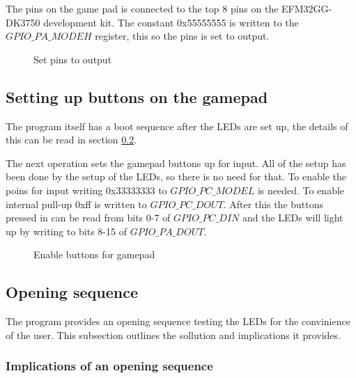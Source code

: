 The pins on the game pad is connected to the top 8 pins on the EFM32GG-DK3750 development kit. The constant 0x55555555 is written to the $GPIO\_PA\_MODEH$ register, this so the pins is set to output.

\begin{figure}[h!]
\caption{Set pins to output}
\label{code:set_drive_gpio_o}
\end{figure}

\subsection{Setting up buttons on the gamepad}
\label{subsec:dev_pros_button_setup}
The program itself has a boot sequence after the LEDs are set up, the details of this can be read in section \ref{subsec:dev_pros_opening_seq}.

The next operation sets the gamepad buttons up for input. All of the setup has been done by the setup of the LEDs, so there is no need for that. To enable the poins for input writing 0x33333333 to $GPIO\_PC\_MODEL$ is needed. To enable internal pull-up 0xff is written to $GPIO\_PC\_DOUT$. After this the buttons pressed in can be read from bits 0-7 of $GPIO\_PC\_DIN$ and the LEDs will light up by writing to bits 8-15 of $GPIO\_PA\_DOUT$.

\begin{figure}[h!]
\caption{Enable buttons for gamepad}
\label{code:set_drive_gpio_o}
\end{figure}

\subsection{Opening sequence}
\label{subsec:dev_pros_opening_seq}

The program provides an opening sequence testing the LEDs for the convinience of the user. This subsection outlines the sollution and implications it provides.

\subsubsection{Implications of an opening sequence}

